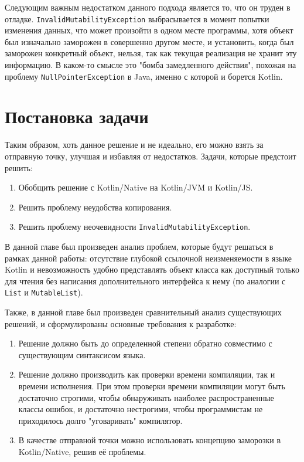 \documentclass[specification,annotation,times]{itmo-student-thesis}
\begin{document}
Следующим важным недостатком данного подхода является то, что он труден в отладке.
\texttt{InvalidMutabilityException} выбрасывается в момент попытки изменения данных, что может произойти в одном месте программы, хотя объект был изначально заморожен в совершенно другом месте, и установить, когда был заморожен конкретный объект, нельзя, так как текущая реализация не хранит эту информацию.
В каком-то смысле это "бомба замедленного действия", похожая на проблему \texttt{NullPointerException} в Java, именно с которой и борется Kotlin.

\section{Постановка задачи}
Таким образом, хоть данное решение и не идеально, его можно взять за отправную точку, улучшая и избавляя от недостатков. Задачи, которые предстоит решить:

\begin{enumerate}
	\item Обобщить решение с Kotlin/Native на Kotlin/JVM и Kotlin/JS.
	\item Решить проблему неудобства копирования.
	\item Решить проблему неочевидности \texttt{InvalidMutabilityException}.
\end{enumerate}



\finishrelatedwork

\chapterconclusion

В данной главе был произведен анализ проблем, которые будут решаться в рамках данной работы: отсутствие глубокой ссылочной неизменяемости в языке Kotlin и невозможность удобно представлять объект класса как доступный только для чтения без написания дополнительного интерфейса к нему (по аналогии с \texttt{List} и \texttt{MutableList}).

Также, в данной главе был произведен сравнительный анализ существующих решений, и сформулированы основные требования к разработке:

\begin{enumerate}
	\item Решение должно быть до определенной степени обратно совместимо с существующим синтаксисом языка.
	\item Решение должно производить как проверки времени компиляции, так и времени исполнения. При этом проверки времени компиляции могут быть достаточно строгими, чтобы обнаруживать наиболее распространенные классы ошибок, и достаточно нестрогими, чтобы программистам не приходилось долго "уговаривать" компилятор.
	\item В качестве отправной точки можно использовать концепцию заморозки в Kotlin/Native, решив её проблемы.
\end{enumerate}
\end{document}
